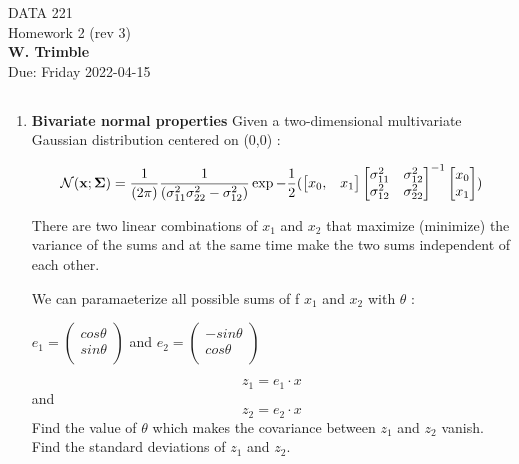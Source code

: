 \documentclass[12pt]{book}
\theoremstyle{definition}
\begin{document}
\begin{center}
{\Large DATA 221 \\  Homework 2  (rev 3)}\\
\textbf{W. Trimble}\\ %
Due: Friday 2022-04-15 
\end{center}

\vspace{0.2 cm}

\subsection*{   }

\begin{enumerate}
\item\label{cheese}
\textbf{Bivariate normal properties}
Given a two-dimensional multivariate Gaussian distribution centered on (0,0) : 

$$ \mathcal{N} ( \mathbf{x} ; \mathbf{\Sigma} ) =
{ 1 \over( 2 \pi  ) }  
{ 1 \over ( \sigma_{11}^2\sigma_{22}^2 - \sigma_{12}^2 )   }
\exp  - { 1 \over 2} (
\begin{bmatrix}
x_0, & x_1
\end{bmatrix}
\begin{bmatrix}
\sigma_{11}^2 & \sigma_{12}^2\\
\sigma_{12}^2 & \sigma_{22}^2
\end{bmatrix}^{-1}
\begin{bmatrix}
x_0 \\
x_1
\end{bmatrix} ) $$

There are two linear combinations of $x_1$ and $x_2$ that maximize (minimize) the variance of the sums
and at the same time make the two sums independent of each other.

We can paramaeterize all possible sums of f $x_1$ and $x_2$  with $\theta$ : 

$e_1 = \begin{pmatrix} 
cos \theta \\
sin \theta   \\
\end{pmatrix} $ 
and 
 $e_2 = \begin{pmatrix} 
-sin \theta \\
cos \theta   \\
\end{pmatrix} $ 

$$ z_1 = e_1 \cdot x $$
and
$$ z_2 = e_2 \cdot x $$
Find the value of $\theta$ which makes the covariance between  $z_1$ and $z_2$ vanish.  Find the standard deviations of $z_1$ and $z_2$.


\end{enumerate}
\end{document}
